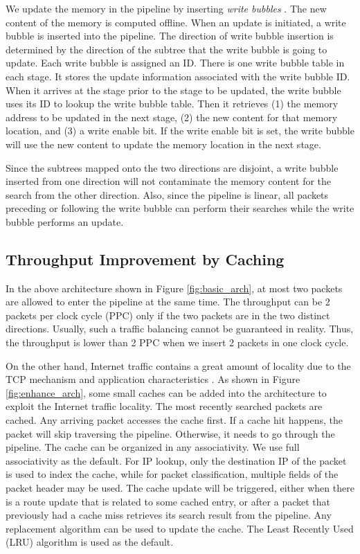 \documentclass{sigcomm-alternate}
\begin{document}
We update the memory in the pipeline by inserting \textit{write bubbles} \cite{infocom03:basu}. The new content of the memory is computed offline. When an update is initiated, a write bubble is inserted into the pipeline. The direction of write bubble insertion is determined by the direction of the subtree that the write bubble is going to update. Each write bubble is assigned an ID. There is one write bubble table in each stage. It stores the update information associated with the write bubble ID. When it arrives at the stage prior to the stage to be updated, the write bubble uses its ID to lookup the write bubble table. Then it retrieves (1) the memory address to be updated in the next stage, (2) the new content for that memory location, and (3) a write enable bit. If the write enable bit is set, the write bubble will use the new content to update the memory location in the next stage. 

Since the subtrees mapped onto the two directions are disjoint, a write bubble inserted from one direction will not contaminate the memory content for the search from the other direction. Also, since the pipeline is linear, all packets preceding or following the write bubble can perform their searches while the write bubble performs an update.


\subsection{Throughput Improvement by Caching}

In the above architecture shown in Figure \ref{fig:basic_arch}, at most two packets are allowed to enter the pipeline at the same time. The throughput can be 2 packets per clock cycle (PPC) only if the two packets are in the two distinct directions. Usually, such a traffic balancing cannot be guaranteed in reality. Thus, the throughput is lower than 2 PPC when we insert 2 packets in one clock cycle.

On the other hand, Internet traffic contains a great amount of locality due to the TCP mechanism and application characteristics \cite{infocom08:jiang}. As shown in Figure \ref{fig:enhance_arch}, some small caches can be added into the architecture to exploit the Internet traffic locality. The most recently searched packets are cached. Any arriving packet accesses the cache first. If a cache hit happens, the packet will skip traversing the pipeline. Otherwise, it needs to go through the pipeline. The cache can be organized in any associativity. We use full associativity as the default. For IP lookup, only the destination IP of the packet is used to index the cache, while for packet classification, multiple fields of the packet header may be used. The cache update will be triggered, either when there is a route update that is related to some cached entry, or after a packet that previously had a cache miss retrieves its search result from the pipeline. Any replacement algorithm can be used to update the cache. The Least Recently Used (LRU) algorithm is used as the default.
\end{document}
